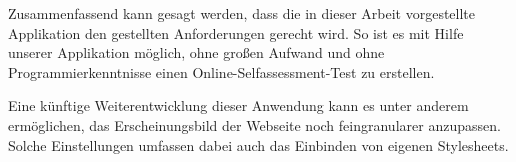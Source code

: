 \label{Zusammenfassung_Ausblick} 
Zusammenfassend kann gesagt werden, dass die in dieser Arbeit vorgestellte Applikation den gestellten Anforderungen gerecht wird.
So ist es mit Hilfe unserer Applikation möglich, ohne großen Aufwand und ohne Programmierkenntnisse einen Online-Selfassessment-Test zu erstellen.

Eine künftige Weiterentwicklung dieser Anwendung kann es unter anderem ermöglichen, das Erscheinungsbild der Webseite noch feingranularer anzupassen.
Solche Einstellungen umfassen dabei auch das Einbinden von eigenen Stylesheets. 

